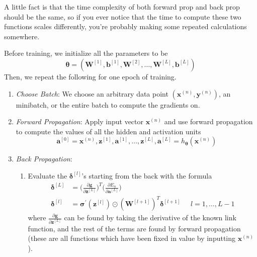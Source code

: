 \documentclass{article}
\begin{document}
  A little fact is that the time complexity of both forward prop and back prop should be the same, so if you ever notice that the time to compute these two functions scales differently, you're probably making some repeated calculations somewhere. 

  \begin{algo}
    Before training, we initialize all the parameters to be 
    \begin{equation}
      \boldsymbol{\theta} = (\mathbf{W}^{[1]}, \mathbf{b}^{[1]}, \mathbf{W}^{[2]}, \ldots, \mathbf{W}^{[L]}, \mathbf{b}^{[L]})
    \end{equation} 
    Then, we repeat the following for one epoch of training. 
    \begin{enumerate}
      \item \textit{Choose Batch}: We choose an arbitrary data point $(\mathbf{x}^{(n)}, \mathbf{y}^{(n)})$, an minibatch, or the entire batch to compute the gradients on. 
      
      \item \textit{Forward Propagation}: Apply input vector $\mathbf{x}^{(n)}$ and use forward propagation to compute the values of all the hidden and activation units 
      \begin{equation}
        \mathbf{a}^{[0]} = \mathbf{x}^{(n)}, \mathbf{z}^{[1]}, \mathbf{a}^{[1]}, \ldots, \mathbf{z}^{[L]}, \mathbf{a}^{[L]} = h_{\boldsymbol{\theta}} (\mathbf{x}^{(n)})
      \end{equation}
      
      \item \textit{Back Propagation}: 
      \begin{enumerate}
        \item Evaluate the $\boldsymbol{\delta}^{[l]}$'s starting from the back with the formula 
        \begin{align}
          \boldsymbol{\delta}^{[L]} & = \bigg( \frac{\partial \mathbf{g}}{\partial \mathbf{z}^{[L]}} \bigg)^T \bigg( \frac{\partial E_n}{\partial \mathbf{a}^{[L]}} \bigg) \\
          \boldsymbol{\delta}^{[l]} & = \boldsymbol{\sigma}^\prime (\mathbf{z}^{[l]}) \odot (\mathbf{W}^{[l+1]})^T \boldsymbol{\delta}^{[l+1]} \;\;\;\;\; l = 1, \ldots, L-1
        \end{align}
        where $\frac{\partial \mathbf{g}}{\partial \mathbf{z}^{[L]}}$ can be found by taking the derivative of the known link function, and the rest of the terms are found by forward propagation (these are all functions which have been fixed in value by inputting $\mathbf{x}^{(n)}$).  


\end{enumerate}
\end{enumerate}
\end{algo}
\end{document}
